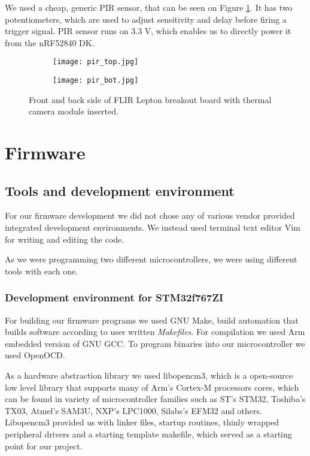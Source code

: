 We used a cheap, generic PIR sensor, that can be seen on Figure \ref{pir_sensor}.
It has two potentiometers, which are used to adjust sensitivity and delay before firing a trigger signal.
PIR sensor runs on 3.3 V, which enables us to directly power it from the nRF52840 DK. 

\begin{figure}[ht] 
    \begin{subfigure}[b]{0.5\textwidth}
        \centering
        \texttt{[image: pir\_top.jpg]} 
    \end{subfigure}
    \begin{subfigure}[b]{0.5\textwidth}
        \centering
        \texttt{[image: pir\_bot.jpg]} 
    \end{subfigure}
    \caption{ Front and back side of FLIR Lepton breakout board with thermal camera module inserted.}
    \label{pir_sensor}
\end{figure}

\section{ Firmware}
\subsection{ Tools and development environment}

For our firmware development we did not chose any of various vendor provided integrated development environments.
We instead used terminal text editor Vim for writing and editing the code.

As we were programming two different microcontrollers, we were using different tools with each one.


\subsubsection{ Development environment for STM32f767ZI}

For building our firmware programs we used GNU Make, build automation that builds software according to user written \textit{Makefiles}.
For compilation we used Arm embedded version of GNU GCC.
To program binaries into our microcontroller we used OpenOCD.

As a hardware abstraction library we used libopencm3, which is a open-source low level library that supports many of Arm's Cortex-M processors cores, which can be found in variety of microcontroller families such as ST's STM32, Toshiba's TX03, Atmel's SAM3U, NXP's LPC1000, Silabs's EFM32 and others.
Libopencm3 provided us with linker files, startup routines, thinly wrapped peripheral drivers and a starting template makefile, which served as a starting point for our project.

